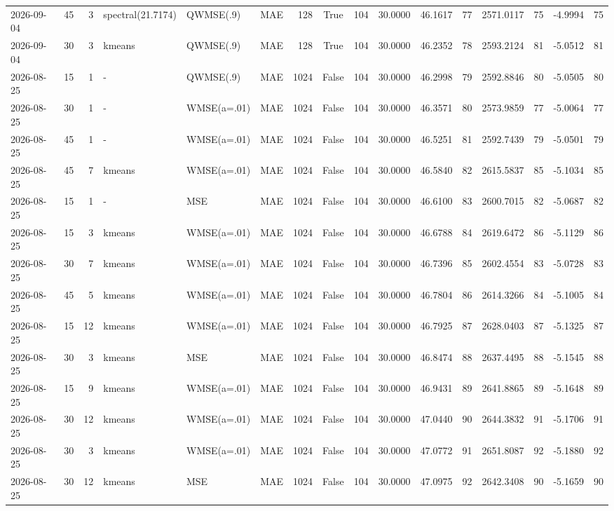 \documentclass[10pt]{article}
\begin{document}
\begin{landscape}
\begin{longtable}{@{}lrrlllrcrrrrrrrr@{}}
2026-09-04 & 45 & 3 & spectral(21.7174) & QWMSE(.9) & MAE & 128 & True & 104 & 30.0000 & 46.1617 & 77 & 2571.0117 & 75 & -4.9994 & 75 \\
2026-09-04 & 30 & 3 & kmeans & QWMSE(.9) & MAE & 128 & True & 104 & 30.0000 & 46.2352 & 78 & 2593.2124 & 81 & -5.0512 & 81 \\
2026-08-25 & 15 & 1 & - & QWMSE(.9) & MAE & 1024 & False & 104 & 30.0000 & 46.2998 & 79 & 2592.8846 & 80 & -5.0505 & 80 \\
2026-08-25 & 30 & 1 & - & WMSE(a=.01) & MAE & 1024 & False & 104 & 30.0000 & 46.3571 & 80 & 2573.9859 & 77 & -5.0064 & 77 \\
2026-08-25 & 45 & 1 & - & WMSE(a=.01) & MAE & 1024 & False & 104 & 30.0000 & 46.5251 & 81 & 2592.7439 & 79 & -5.0501 & 79 \\
2026-08-25 & 45 & 7 & kmeans & WMSE(a=.01) & MAE & 1024 & False & 104 & 30.0000 & 46.5840 & 82 & 2615.5837 & 85 & -5.1034 & 85 \\
2026-08-25 & 15 & 1 & - & MSE & MAE & 1024 & False & 104 & 30.0000 & 46.6100 & 83 & 2600.7015 & 82 & -5.0687 & 82 \\
2026-08-25 & 15 & 3 & kmeans & WMSE(a=.01) & MAE & 1024 & False & 104 & 30.0000 & 46.6788 & 84 & 2619.6472 & 86 & -5.1129 & 86 \\
2026-08-25 & 30 & 7 & kmeans & WMSE(a=.01) & MAE & 1024 & False & 104 & 30.0000 & 46.7396 & 85 & 2602.4554 & 83 & -5.0728 & 83 \\
2026-08-25 & 45 & 5 & kmeans & WMSE(a=.01) & MAE & 1024 & False & 104 & 30.0000 & 46.7804 & 86 & 2614.3266 & 84 & -5.1005 & 84 \\
2026-08-25 & 15 & 12 & kmeans & WMSE(a=.01) & MAE & 1024 & False & 104 & 30.0000 & 46.7925 & 87 & 2628.0403 & 87 & -5.1325 & 87 \\
2026-08-25 & 30 & 3 & kmeans & MSE & MAE & 1024 & False & 104 & 30.0000 & 46.8474 & 88 & 2637.4495 & 88 & -5.1545 & 88 \\
2026-08-25 & 15 & 9 & kmeans & WMSE(a=.01) & MAE & 1024 & False & 104 & 30.0000 & 46.9431 & 89 & 2641.8865 & 89 & -5.1648 & 89 \\
2026-08-25 & 30 & 12 & kmeans & WMSE(a=.01) & MAE & 1024 & False & 104 & 30.0000 & 47.0440 & 90 & 2644.3832 & 91 & -5.1706 & 91 \\
2026-08-25 & 30 & 3 & kmeans & WMSE(a=.01) & MAE & 1024 & False & 104 & 30.0000 & 47.0772 & 91 & 2651.8087 & 92 & -5.1880 & 92 \\
2026-08-25 & 30 & 12 & kmeans & MSE & MAE & 1024 & False & 104 & 30.0000 & 47.0975 & 92 & 2642.3408 & 90 & -5.1659 & 90 \\

\end{longtable}
\end{landscape}
\end{document}
